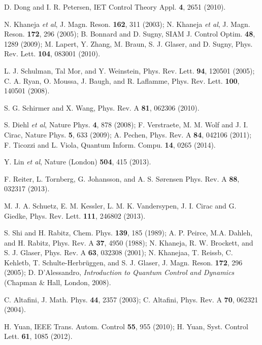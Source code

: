 \documentclass[prl,aps,twocolumn, reprint, amsmath,amssymb,showpacs,superscriptaddress]{revtex4}
\begin{document}
\begin{thebibliography}{28}
 D. Dong and I. R. Petersen, IET Control Theory Appl. \textbf{4}, 2651 (2010).

 N. Khaneja \emph{et al}, J. Magn. Reson. \textbf{162}, 311 (2003); N. Khaneja \emph{et al}, J. Magn. Reson. \textbf{172}, 296 (2005); B. Bonnard and D. Sugny, SIAM J. Control Optim. \textbf{48}, 1289 (2009); M. Lapert, Y. Zhang, M. Braun, S. J. Glaser, and D. Sugny, Phys. Rev. Lett. \textbf{104}, 083001 (2010).

 L. J. Schulman, Tal Mor, and Y. Weinstein, Phys. Rev. Lett. \textbf{94}, 120501 (2005); C. A. Ryan, O. Moussa, J. Baugh, and R. Laflamme, Phys. Rev. Lett. \textbf{100}, 140501 (2008).

 S. G. Schirmer and X. Wang, Phys. Rev. A \textbf{81}, 062306 (2010).

 S. Diehl \emph{et al}, Nature Phys. \textbf{4}, 878 (2008); F. Verstraete, M. M. Wolf and J. I. Cirac, Nature Phys. \textbf{5}, 633 (2009); A. Pechen, Phys. Rev. A \textbf{84}, 042106 (2011); F. Ticozzi and L. Viola, Quantum Inform. Compu. \textbf{14}, 0265 (2014).

 Y. Lin \emph{et al}, Nature (London) \textbf{504}, 415 (2013).

 F. Reiter, L. Tornberg, G. Johansson, and A. S. S{\o}rensen Phys. Rev. A \textbf{88}, 032317 (2013).

 M. J. A. Schuetz, E. M. Kessler, L. M. K. Vandersypen, J. I. Cirac and G. Giedke, Phys. Rev. Lett. \textbf{111}, 246802 (2013).



 S. Shi and H. Rabitz, Chem. Phys. \textbf{139}, 185 (1989); A. P. Peirce, M.A. Dahleh, and H. Rabitz, Phys. Rev. A \textbf{37}, 4950 (1988); N. Khaneja, R. W. Brockett, and S. J. Glaser, Phys. Rev. A \textbf{63}, 032308 (2001); N. Khanejaa, T. Reissb, C. Kehletb, T. Schulte-Herbr{\"{u}}ggen, and S. J. Glaser, J. Magn. Reson. \textbf{172}, 296 (2005); D. D'Alessandro, \emph{Introduction to Quantum Control and Dynamics} (Chapman $\&$ Hall, London, 2008).

 C. Altafini, J. Math. Phys. \textbf{44}, 2357 (2003); C. Altafini, Phys. Rev. A \textbf{70}, 062321 (2004).



 H. Yuan, IEEE Trans. Autom. Control \textbf{55}, 955 (2010); H. Yuan, Syst. Control Lett. \textbf{61}, 1085 (2012).


\end{thebibliography}
\end{document}
